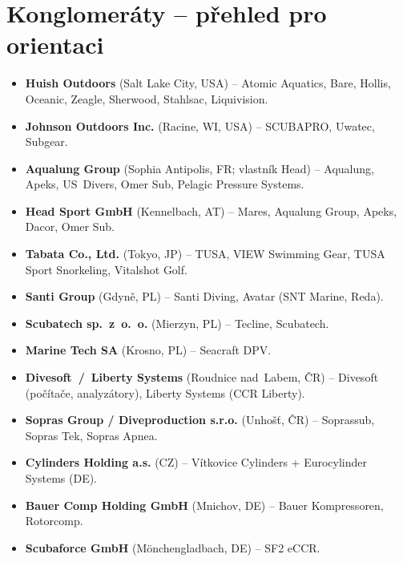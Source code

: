 \documentclass[11pt,a4paper]{article}
\begin{document}
\section{Konglomeráty -- přehled pro orientaci}

\begin{itemize}
\item \textbf{Huish Outdoors} (Salt Lake City, USA) -- Atomic Aquatics, Bare, Hollis, Oceanic, Zeagle, Sherwood, Stahlsac, Liquivision.

\item \textbf{Johnson Outdoors Inc.} (Racine, WI, USA) -- SCUBAPRO, Uwatec, Subgear.

\item \textbf{Aqualung Group} (Sophia Antipolis, FR; vlastník Head) -- Aqualung, Apeks, US~Divers, Omer Sub, Pelagic Pressure Systems.

\item \textbf{Head Sport GmbH} (Kennelbach, AT) -- Mares, Aqualung Group, Apeks, Dacor, Omer Sub.

\item \textbf{Tabata Co., Ltd.} (Tokyo, JP) -- TUSA, VIEW Swimming Gear, TUSA Sport Snorkeling, Vitalshot Golf.

\item \textbf{Santi Group} (Gdyně, PL) -- Santi Diving, Avatar (SNT Marine, Reda).

\item \textbf{Scubatech sp.~z~o.~o.} (Mierzyn, PL) -- Tecline, Scubatech.

\item \textbf{Marine Tech SA} (Krosno, PL) -- Seacraft DPV.

\item \textbf{Divesoft~/~Liberty Systems} (Roudnice nad~Labem, ČR) -- Divesoft (počítače, analyzátory), Liberty Systems (CCR Liberty).

\item \textbf{Sopras Group / Diveproduction s.r.o.} (Unhošť, ČR) -- Soprassub, Sopras Tek, Sopras Apnea.

\item \textbf{Cylinders Holding a.s.} (CZ) -- Vítkovice Cylinders + Eurocylinder Systems (DE).

\item \textbf{Bauer Comp Holding GmbH} (Mnichov, DE) -- Bauer Kompressoren, Rotorcomp.

\item \textbf{Scubaforce GmbH} (Mönchengladbach, DE) -- SF2 eCCR.


\end{itemize}
\end{document}
